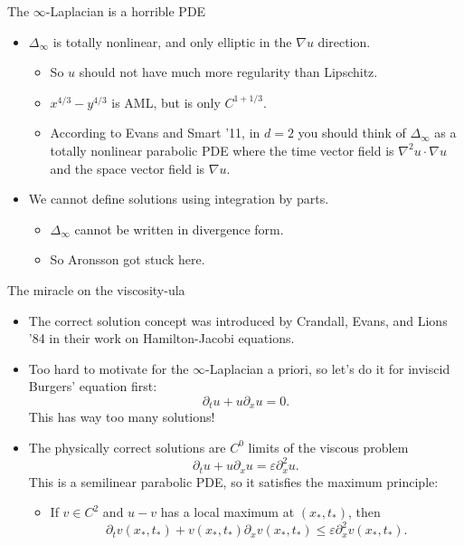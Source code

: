 \documentclass[10pt]{beamer}
\begin{document}
\begin{frame}{The $\infty$-Laplacian is a horrible PDE}
\begin{itemize}
\item $\Delta_\infty$ is totally nonlinear, and only elliptic in the $\nabla u$ direction.  
\begin{itemize}
\item So $u$ should not have much more regularity than Lipschitz. 
\item $x^{4/3} - y^{4/3}$ is AML, but is only $C^{1 + 1/3}$. 
\item According to Evans and Smart '11, in $d = 2$ you should think of $\Delta_\infty$ as a totally nonlinear parabolic PDE where the time vector field is $\nabla^2 u \cdot \nabla u$ and the space vector field is $\nabla u$. \pause
\end{itemize}
\item We cannot define solutions using integration by parts. 
\begin{itemize}
\item $\Delta_\infty$ cannot be written in divergence form. 
\item So Aronsson got stuck here.
\end{itemize}
\end{itemize}
\end{frame}

\begin{frame}{The miracle on the viscosity-ula}
\begin{itemize}
\item The correct solution concept was introduced by Crandall, Evans, and Lions '84 in their work on Hamilton-Jacobi equations. \pause
\item Too hard to motivate for the $\infty$-Laplacian a priori, so let's do it for inviscid Burgers' equation first:
$$\partial_t u + u \partial_x u = 0.$$
This has way too many solutions! \pause
\item The physically correct solutions are $C^0$ limits of the viscous problem 
$$\partial_t u + u \partial_x u = \varepsilon \partial_x^2 u.$$
This is a semilinear parabolic PDE, so it satisfies the maximum principle: \pause
\begin{itemize}
\item If $v \in C^2$ and $u - v$ has a local maximum at $(x_*, t_*)$, then
$$\partial_t v(x_*, t_*) + v(x_*, t_*) \partial_x v(x_*, t_*) \leq \varepsilon \partial_x^2 v(x_*, t_*).$$
\end{itemize}
\end{itemize}
\end{frame}
\end{document}
